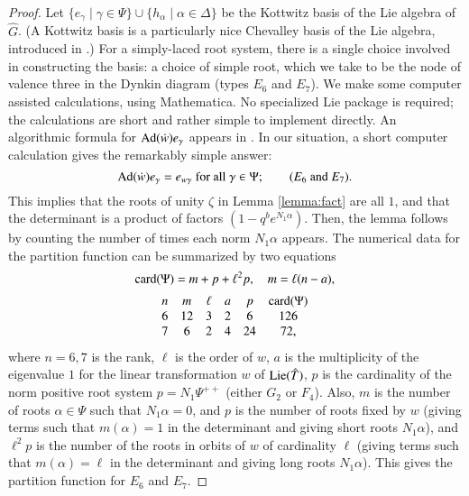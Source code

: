 \begin{proof}
  Let $\{ e_\gamma \mid \gamma\in \Psi\}\cup \{h_\alpha\mid
  \alpha\in\Delta\}$ be the Kottwitz basis of the Lie algebra of $\hat
  G$.  (A Kottwitz basis is a particularly nice Chevalley basis of the
  Lie algebra, introduced in \cite{cassstructure}.)  For a
  simply-laced root system, there is a single choice involved in
  constructing the basis: a choice of simple root, which we take to be
  the node of valence three in the Dynkin diagram (types $E_6$ and
  $E_7$).  We make some computer assisted calculations, using
  Mathematica.  No specialized Lie package is required; the
  calculations are short and rather simple to implement directly.  An
  algorithmic formula for ${\operatorname{Ad}}(\dot w) e_\gamma$ appears in
  \cite{cassstructure}.  In our situation, a short computer
  calculation gives the remarkably simple answer:
\[
{\operatorname{Ad}}(\dot w) e_\gamma 
= e_{w\gamma}\text{ for all } \gamma\in \Psi;
\qquad (E_6 \text{ and } E_7).
\]
This implies that the roots of unity $\zeta$ in Lemma \ref{lemma:fact}
are all $1$, and that the determinant is a product of factors $(1-q^b
e^{N_1\alpha})$.  Then, the lemma follows by counting the number of
times each norm $N_1\alpha$ appears.  The numerical data for the
partition function can be summarized by two equations
\begin{equation}\label{eqn:count}
{\operatorname{card}}(\Psi) = m + p + \ell^2 p,\quad m = \ell(n-a),
\end{equation}
\begin{align*}
\begin{matrix}
n & m&\ell & a & p & {\operatorname{card}}(\Psi)\\
6 & 12&3 & 2 & 6 & 126\\
7 & 6& 2 & 4 & 24 & 72,
\end{matrix}
\end{align*}
where $n=6,7$ is the rank, $\ell$ is the order of $w$, $a$ is the
multiplicity of the eigenvalue $1$ for the linear transformation $w$
of ${\operatorname{Lie}}(\hat T)$, $p$ is the cardinality of the norm positive
root system $p = N_1\Psi^{++}$ (either $G_2$ or $F_4$).  Also, $m$ is
the number of roots $\alpha\in\Psi$ such that $N_1\alpha=0$, and $p$
is the number of roots fixed by $w$ (giving terms such that
$m(\alpha)=1$ in the determinant and giving short roots $N_1\alpha$),
and $\ell^2p$ is the number of the roots in orbits of $w$ of
cardinality $\ell$ (giving terms such that $m(\alpha)=\ell$ in the
determinant and giving long roots $N_1\alpha$).  This gives the
partition function for $E_6$ and $E_7$.


\end{proof}
